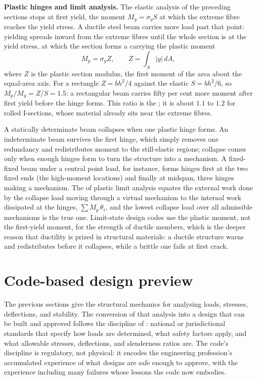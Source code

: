 \begin{mastery}
\textbf{Plastic hinges and limit analysis.} The elastic analysis of
the preceding sections stops at first yield, the moment $M_y=\sigma_y
S$ at which the extreme fibre reaches the yield stress. A ductile steel
beam carries more load past that point: yielding spreads inward from
the extreme fibres until the whole section is at the yield stress, at
which the section forms a  carrying the plastic
moment
\[
M_p = \sigma_y Z, \qquad Z = \int_A |y|\,dA,
\]
where $Z$ is the plastic section modulus, the first moment of the area
about the equal-area axis. For a rectangle $Z=bh^2/4$ against the
elastic $S=bh^2/6$, so $M_p/M_y = Z/S = 1.5$: a rectangular beam
carries fifty per cent more moment after first yield before the hinge
forms. This ratio is the ; it is about $1.1$ to
$1.2$ for rolled I-sections, whose material already sits near the
extreme fibres.

A statically determinate beam collapses when one plastic hinge forms.
An indeterminate beam survives the first hinge, which simply removes
one redundancy and redistributes moment to the still-elastic regions;
collapse comes only when enough hinges form to turn the structure into
a mechanism. A fixed-fixed beam under a central point load, for
instance, forms hinges first at the two fixed ends (the high-moment
locations) and finally at midspan, three hinges making a mechanism. The
 of plastic limit analysis
equates the external work done by the collapse load moving through a
virtual mechanism to the internal work dissipated at the hinges,
$\sum M_p\,\theta_i$, and the lowest collapse load over all admissible
mechanisms is the true one. Limit-state design codes use the plastic
moment, not the first-yield moment, for the strength of ductile
members, which is the deeper reason that ductility is prized in
structural materials: a ductile structure warns and redistributes
before it collapses, while a brittle one fails at first crack.
\end{mastery}

\section{Code-based design preview}

The previous sections give the structural mechanics for analysing
loads, stresses, deflections, and stability. The conversion of that
analysis into a design that can be built and approved follows the
discipline of : national or jurisdictional
standards that specify how loads are determined, what safety factors
apply, and what allowable stresses, deflections, and slenderness
ratios are. The code's discipline is regulatory, not physical: it
encodes the engineering profession's accumulated experience of what
designs are safe enough to approve, with the experience including
many failures whose lessons the code now embodies.

